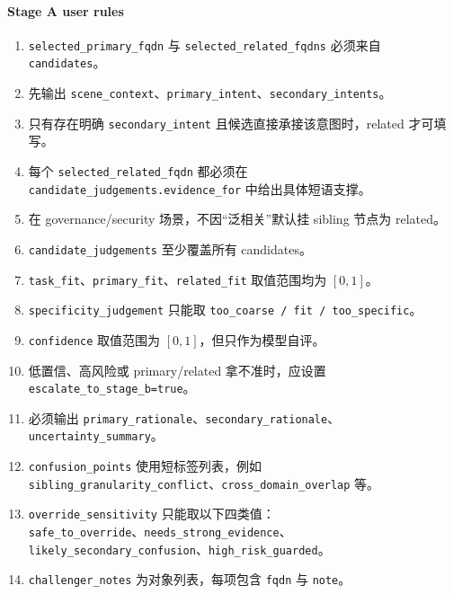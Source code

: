 \documentclass[11pt,a4paper]{ctexart}
\begin{document}
\paragraph{Stage A user rules}
\begin{enumerate}[leftmargin=1.6em]
\item \texttt{selected\_primary\_fqdn} 与 \texttt{selected\_related\_fqdns} 必须来自 \texttt{candidates}。
\item 先输出 \texttt{scene\_context}、\texttt{primary\_intent}、\texttt{secondary\_intents}。
\item 只有存在明确 \texttt{secondary\_intent} 且候选直接承接该意图时，related 才可填写。
\item 每个 \texttt{selected\_related\_fqdn} 都必须在 \texttt{candidate\_judgements.evidence\_for} 中给出具体短语支撑。
\item 在 governance/security 场景，不因“泛相关”默认挂 sibling 节点为 related。
\item \texttt{candidate\_judgements} 至少覆盖所有 candidates。
\item \texttt{task\_fit}、\texttt{primary\_fit}、\texttt{related\_fit} 取值范围均为 $[0,1]$。
\item \texttt{specificity\_judgement} 只能取 \texttt{too\_coarse / fit / too\_specific}。
\item \texttt{confidence} 取值范围为 $[0,1]$，但只作为模型自评。
\item 低置信、高风险或 primary/related 拿不准时，应设置 \texttt{escalate\_to\_stage\_b=true}。
\item 必须输出 \texttt{primary\_rationale}、\texttt{secondary\_rationale}、\texttt{uncertainty\_summary}。
\item \texttt{confusion\_points} 使用短标签列表，例如\\
\texttt{sibling\_granularity\_conflict}、\texttt{cross\_domain\_overlap} 等。
\item \texttt{override\_sensitivity} 只能取以下四类值：\\
\texttt{safe\_to\_override}、\texttt{needs\_strong\_evidence}、\\
\texttt{likely\_secondary\_confusion}、\texttt{high\_risk\_guarded}。
\item \texttt{challenger\_notes} 为对象列表，每项包含 \texttt{fqdn} 与 \texttt{note}。
\end{enumerate}
\end{document}
